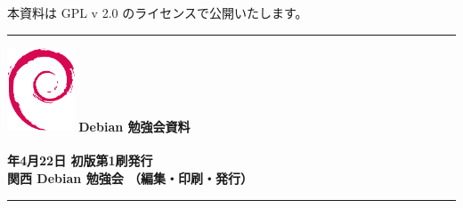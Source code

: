 \documentclass[mingoth,a4paper]{jsarticle}
\newcommand{\debmtgyear}{2018}
\newcommand{\debmtgdate}{22}
\newcommand{\debmtgmonth}{4}
\begin{document}
\vspace{\fill}
本資料は GPL v 2.0 のライセンスで公開いたします。

\clearpage

%

\mbox{}\newpage
\mbox{}\newpage

\printindex

 \begin{minipage}[b]{0.2\hsize}
 \end{minipage}
 \begin{minipage}[b]{0.8\hsize}

 \vspace*{15cm}
 \rule{\hsize}{1mm}
 \vspace{2mm}
 \includegraphics[width=2cm]{image200502/openlogo-nd.eps}
 \noindent \Large \bfseries{Debian 勉強会資料}\\ \\
 \noindent \normalfont \debmtgyear{}年\debmtgmonth{}月\debmtgdate{}日 \hspace{5mm}  初版第1刷発行\\
 \noindent \normalfont 関西 Debian 勉強会 （編集・印刷・発行）\\
 \rule{\hsize}{1mm}
 \end{minipage}
\end{document}
